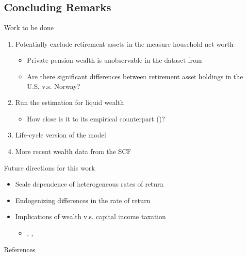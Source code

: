 \documentclass{beamer}
\begin{document}
    


\subsection{Concluding Remarks}

\begin{frame}{Work to be done}
       
       \begin{enumerate}
       \item Potentially exclude retirement assets in the measure household net worth 
       \begin{itemize}
      \item Private pension wealth is unobservable in the dataset from \cite{aflgdmlp20}
      \item Are there significant differences between retirement asset holdings in the U.S. v.s. Norway?
      \end{itemize}
       \item Run the estimation for liquid wealth
      \begin{itemize}
      \item How close is it to its empirical counterpart ()?
      \end{itemize}
      \item Life-cycle version of the model
      \item More recent wealth data from the SCF  
      \end{enumerate}
  
\end{frame}

\begin{frame}{Future directions for this work}
    \begin{itemize}
    \item Scale dependence of heterogeneous rates of return
    \item Endogenizing differences in the rate of return
    \item Implications of wealth v.s. capital income taxation
      \begin{itemize}
        \item \parencite{Benhabib2008}, \parencite{Benhabib2011}, \parencite{Guvenen2019}
      \end{itemize}
    \end{itemize}
\end{frame}


\begin{frame}[allowframebreaks]{References}
  \printbibliography
\end{frame}
\end{document}
